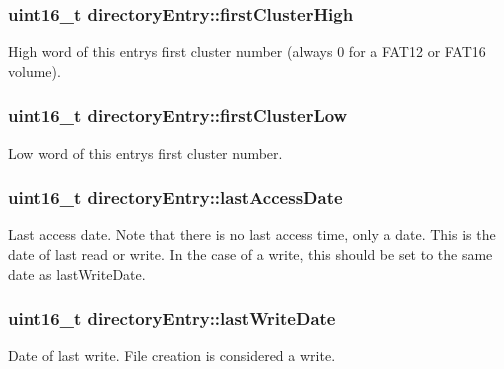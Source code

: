 \subsubsection[{\texorpdfstring{first\+Cluster\+High}{firstClusterHigh}}]{\setlength{\rightskip}{0pt plus 5cm}uint16\+\_\+t directory\+Entry\+::first\+Cluster\+High}\hypertarget{structdirectory_entry_a3b492598b2b05e8425d2a500443613bd}{}\label{structdirectory_entry_a3b492598b2b05e8425d2a500443613bd}
High word of this entry\textquotesingle{}s first cluster number (always 0 for a F\+A\+T12 or F\+A\+T16 volume). 
\subsubsection[{\texorpdfstring{first\+Cluster\+Low}{firstClusterLow}}]{\setlength{\rightskip}{0pt plus 5cm}uint16\+\_\+t directory\+Entry\+::first\+Cluster\+Low}\hypertarget{structdirectory_entry_a74bd660417a9c3501eae353326c14bb9}{}\label{structdirectory_entry_a74bd660417a9c3501eae353326c14bb9}
Low word of this entry\textquotesingle{}s first cluster number. 
\subsubsection[{\texorpdfstring{last\+Access\+Date}{lastAccessDate}}]{\setlength{\rightskip}{0pt plus 5cm}uint16\+\_\+t directory\+Entry\+::last\+Access\+Date}\hypertarget{structdirectory_entry_abca70dc5c5fcbe199fd78df010111331}{}\label{structdirectory_entry_abca70dc5c5fcbe199fd78df010111331}
Last access date. Note that there is no last access time, only a date. This is the date of last read or write. In the case of a write, this should be set to the same date as last\+Write\+Date. 
\subsubsection[{\texorpdfstring{last\+Write\+Date}{lastWriteDate}}]{\setlength{\rightskip}{0pt plus 5cm}uint16\+\_\+t directory\+Entry\+::last\+Write\+Date}\hypertarget{structdirectory_entry_a12b2e7cf87482a942a0b5d3df6c51468}{}\label{structdirectory_entry_a12b2e7cf87482a942a0b5d3df6c51468}
Date of last write. File creation is considered a write. 
